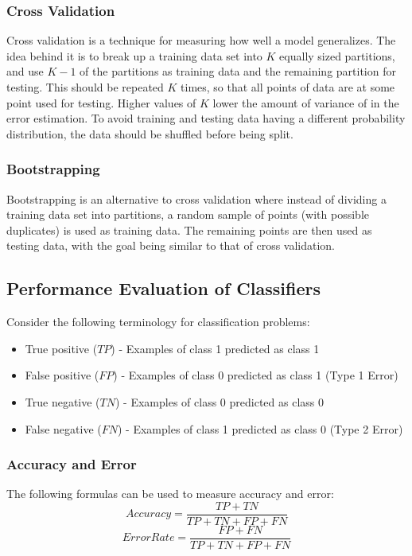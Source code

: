 \documentclass[12pt]{article}
\begin{document}
        \subsubsection{Cross Validation}
            Cross validation is a technique for measuring how well a model generalizes. The idea behind it is to break
            up a training data set into $K$ equally sized partitions, and use $K-1$ of the partitions as training data
            and the remaining partition for testing. This should be repeated $K$ times, so that all points of data are
            at some point used for testing. Higher values of $K$ lower the amount of variance of in the error
            estimation. To avoid training and testing data having a different probability distribution, the data should
            be shuffled before being split.

        \subsubsection{Bootstrapping}
            Bootstrapping is an alternative to cross validation where instead of dividing a training data set into
            partitions, a random sample of points (with possible duplicates) is used as training data. The remaining
            points are then used as testing data, with the goal being similar to that of cross validation.
    
    \subsection{Performance Evaluation of Classifiers}
        Consider the following terminology for classification problems:
        \begin{itemize}
            \item True positive ($TP$) - Examples of class 1 predicted as class 1
            \item False positive ($FP$) - Examples of class 0 predicted as class 1 (Type 1 Error)
            \item True negative ($TN$) - Examples of class 0 predicted as class 0
            \item False negative ($FN$) - Examples of class 1 predicted as class 0 (Type 2 Error)
        \end{itemize}
    
        \subsubsection{Accuracy and Error}
            The following formulas can be used to measure accuracy and error:
            $$Accuracy = \frac{TP + TN}{TP + TN + FP + FN}$$
            $$ErrorRate = \frac{FP + FN}{TP + TN + FP + FN}$$
    
\end{document}
